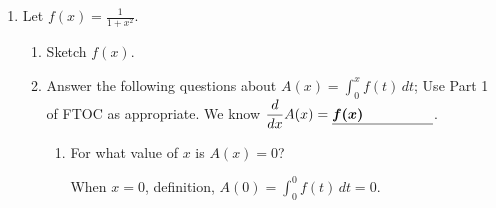 \documentclass[main]{subfiles}
\begin{document}
\begin{enumerate}[resume]
{\begin{enumerate}[resume]
      \begin{solution}
        We've already seen that
        \[ f(x) \leq \frac{A(x + h) - A(x)}{h} \leq f(x + h).\] When
        we take the limit as $h \to 0$, both $f(x)$ and $f(x + h)$
        approach $f(x)$.  Therefore, $\displaystyle \frac{A(x + h) -
          A(x)}{h}$ is pinned between two functions that are both
        tending to $f(x)$ as $h \to 0$, so it must also tend to $f(x)$.
        That is,
        \[ \lim_{h \to 0} \frac{A(x + h) - A(x)}{h} = f(x).\]
        This exactly says that $A'(x) = f(x)$, which is FTOC 1! 
      \end{solution}

      \pspace{\newpage}

    \end{enumerate}
  }

\item 
  Let $f(x) = \displaystyle \frac{1}{1 + x^2}$.
  \begin{enumerate}
  \item
    \begin{problem}[\stretch{1.5}]
      Sketch $f(x)$.
    \end{problem}

    \begin{solution}
      \begin{center}
      \end{center}
    \end{solution}

  \item Answer the following questions about 
  $\displaystyle A(x)=\int_0^x f(t)\,dt$; 
  Use Part
  1 of FTOC as appropriate.
  We know $\dfrac{d}{dx}A(x)=\fitb{1in}{f(x)}$.
  \begin{enumerate}
  \item
    \begin{problem}[\stretch{0.25}]
      For what value of $x$ is $A(x)=0$?
    \end{problem}

    \begin{solution}
      When $\boxed{x=0}$, definition, 
      $\displaystyle A(0) = \int_0^0 f(t)\,dt = 0$. 
    \end{solution}


\end{enumerate}
\end{enumerate}
\end{enumerate}
\end{document}
